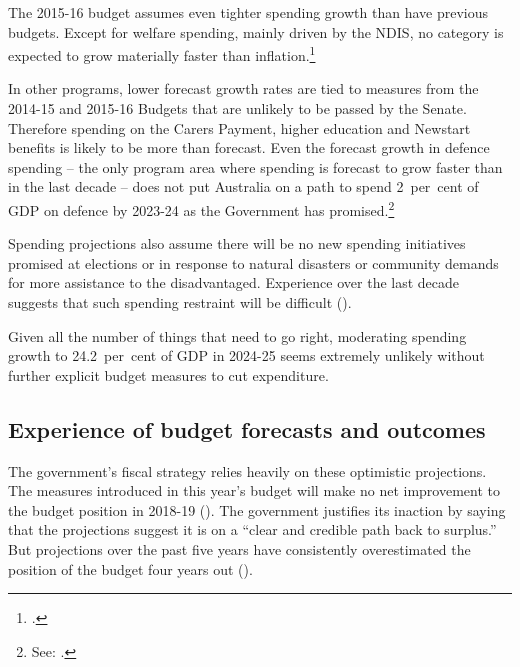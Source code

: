 \documentclass[twoside,english]{palatinob5portrait}
\begin{document}
The 2015-16 budget assumes even tighter spending growth than have previous budgets. Except for welfare spending, mainly driven by the NDIS, no category is expected to grow materially faster than inflation.\footcite[][BP No.~1, pp.~5-11]{Treasury2015BudgetPapers201516}  

In other programs, lower forecast growth rates are tied to measures from the 2014-15 and 2015-16 Budgets that are unlikely to be passed by the Senate. Therefore spending on the Carers Payment, higher education and Newstart benefits is likely to be more than forecast\DEVIATION{}. Even the forecast growth in defence spending – the only program area where spending is forecast to grow faster than in the last decade – does not put Australia on a path to spend 2~per~cent of GDP on defence by 2023-24 as the Government has promised.\footnote{See: \textcite[][1]{Defence2014}.} 


Spending projections also assume there will be no new spending initiatives promised at elections or in response to natural disasters or community demands for more assistance to the disadvantaged. Experience over the last decade suggests that such spending restraint will be difficult ().

Given all the number of things that need to go right, moderating spending growth to 24.2~per~cent of GDP in 2024-25 seems extremely unlikely without further explicit budget measures to cut expenditure.

\subsection{Experience of budget forecasts and outcomes}\label{subsubsec:3-3-3}
The government’s fiscal strategy relies heavily on these optimistic projections. The measures introduced in this year’s budget will make no net improvement to the budget position in 2018-19 (). The government justifies its inaction by saying that the projections suggest it is on a “clear and credible path back to surplus.”  But projections over the past five years have consistently overestimated the position of the budget four years out (). 
\end{document}
